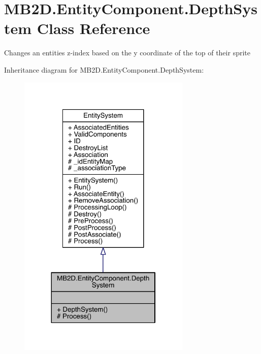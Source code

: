 \hypertarget{class_m_b2_d_1_1_entity_component_1_1_depth_system}{}\section{M\+B2\+D.\+Entity\+Component.\+Depth\+System Class Reference}
\label{class_m_b2_d_1_1_entity_component_1_1_depth_system}


Changes an entities z-\/index based on the y coordinate of the top of their sprite  




Inheritance diagram for M\+B2\+D.\+Entity\+Component.\+Depth\+System\+:\nopagebreak
\begin{figure}[H]
\begin{center}
\leavevmode
\includegraphics[width=233pt]{class_m_b2_d_1_1_entity_component_1_1_depth_system__inherit__graph}
\end{center}
\end{figure}


